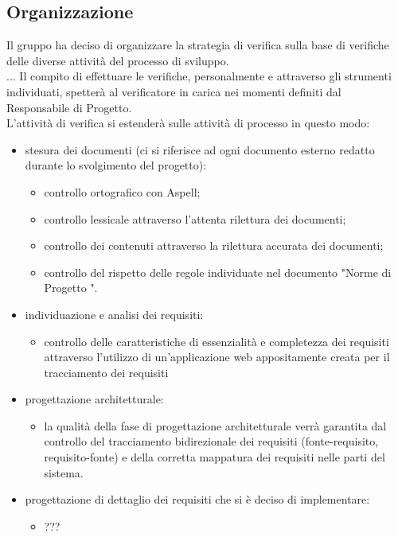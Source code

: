 \subsection{Organizzazione}
	Il gruppo \groupname ha deciso di organizzare la strategia di verifica sulla base  di verifiche delle diverse attività del processo di sviluppo.\\
	...
	Il compito di effettuare le verifiche, personalmente e attraverso gli strumenti individuati, spetterà al verificatore in carica nei momenti definiti dal Responsabile di Progetto.\\
	L'attività di verifica si estenderà sulle attività di processo in questo modo:
	\begin{itemize}
		\item stesura dei documenti (ci si riferisce ad ogni documento esterno redatto durante lo svolgimento del progetto):
			\begin{itemize}
				\item controllo ortografico con Aspell;
				\item controllo lessicale attraverso l'attenta rilettura dei documenti;
				\item controllo dei contenuti attraverso la rilettura accurata dei documenti;
				\item controllo del rispetto delle regole individuate nel documento "Norme di Progetto \lastversion".
			\end{itemize}
		\item individuazione e analisi dei requisiti:
			\begin{itemize}
				\item controllo delle caratteristiche di essenzialità e completezza dei requisiti attraverso l'utilizzo di un'applicazione web appositamente creata per il tracciamento dei requisiti
			\end{itemize}
		\item progettazione architetturale:
			\begin{itemize}
				\item la qualità della fase di progettazione architetturale verrà garantita dal controllo del tracciamento bidirezionale dei requisiti (fonte-requisito, requisito-fonte) e della corretta mappatura dei requisiti nelle parti del sistema.
			\end{itemize}
		\item progettazione di dettaglio dei requisiti che si è deciso di implementare: 
			\begin{itemize}
				\item ???

\end{itemize}
\end{itemize}
